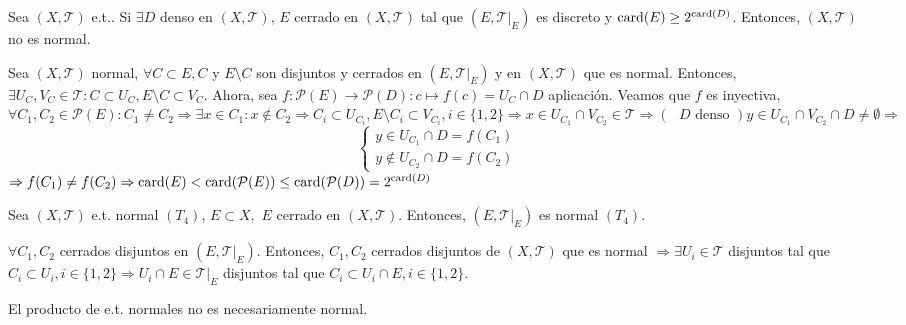 \begin{lem}[Jones]
  Sea $( X, \mathcal{T} )$ e.t.. Si $\exists D$ denso en $ ( X, \mathcal{T} )$, $E$ cerrado en $( X, \mathcal{T} )$ tal que $( E, \mathcal{T}|_{E})$ es discreto y $\operatorname{card}(E) \geq 2^{\operatorname{card}(D)}$. Entonces, $( X, \mathcal{T} )$ no es normal.
\end{lem}

\begin{dem}
  Sea $( X, \mathcal{T} )$ normal, $\forall C \subset E, C$ y $E \setminus C$ son disjuntos y cerrados en $( E, \mathcal{T}|_{E})$ y en $( X, \mathcal{T} )$ que es normal. Entonces, $\exists U_{C}, V_{C} \in \mathcal{T}: C \subset U_{C}, E \setminus C \subset V_{C} $. Ahora, sea $f: \mathcal{P}(E) \to \mathcal{P}(D): c \mapsto f(c) = U_{C} \cap D$ aplicación. Veamos que $f$ es inyectiva, $\forall C_{1}, C_{2} \in \mathcal{P}(E) : C_{1} \neq C_{2} \Rightarrow \exists x \in C_{1} : x \not \in C_{2} \Rightarrow C_{i} \subset U_{C_{i}}, E \setminus C_{i} \subset V_{C_{i}}, i \in \{ 1, 2 \} \Rightarrow x \in U_{C_{1}} \cap V_{C_{2}} \in \mathcal{T} \Rightarrow (\text{ $D$ denso }) y \in U_{C_{1}} \cap V_{C_{2}} \cap D \neq \emptyset \Rightarrow$
  \[ 
    \begin{cases}
      y \in U_{C_{1}} \cap D = f(C_{1}) \\ 
      y \not \in U_{C_{2}} \cap D = f(C_{2}) 
    \end{cases} 
  \] 
  $\Rightarrow f(C_{1}) \neq f(C_{2}) \Rightarrow  \operatorname{card}(E) < \operatorname{card}(\mathcal{P}(E)) \leq \operatorname{card}(\mathcal{P}(D)) = 2^{\operatorname{card}(D)} $
\end{dem}

\begin{prop}
  Sea $( X, \mathcal{T} )$ e.t. normal $( T_{4})$, $E \subset X,$ $E$ cerrado en $( X, \mathcal{T} )$. Entonces, $( E, \mathcal{T}|_{E})$ es normal $(T_{4})$.
\end{prop}

\begin{dem}
  $\forall C_{1}, C_{2}$ cerrados disjuntos en $( E, \mathcal{T}|_{E})$. Entonces, $C_{1}, C_{2}$ cerrados disjuntos de $ ( X, \mathcal{T} )$ que es normal $ \Rightarrow \exists U_{i} \in \mathcal{T}$ disjuntos tal que $C_{i} \subset U_{i},  i \in \{  1, 2 \} \Rightarrow U_{i} \cap E \in \mathcal{T}|_{E}$ disjuntos tal que $C_{i} \subset U_{i} \cap E, i \in \{ 1, 2 \}$.
\end{dem}

\begin{obs}
  El producto de e.t. normales no es necesariamente normal.
\end{obs}

